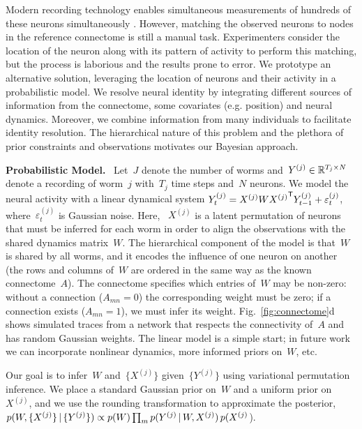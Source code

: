 \documentclass[twoside]{article}
\DeclareRobustCommand{\parhead}[1]{\textbf{#1}~}
\begin{document}
Modern recording technology enables simultaneous measurements of
hundreds of these neurons simultaneously \citep{Kato2015,
  nguyen2016whole}.  However, matching the observed neurons to nodes
in the reference connectome is still a manual task.  Experimenters
consider the location of the neuron along with its pattern of activity
to perform this matching, but the process is laborious and the results
prone to error. We prototype an alternative solution, leveraging the
location of neurons and their activity in a probabilistic model. We
resolve neural identity by integrating different sources of
information from the connectome, some covariates (e.g. position) and
neural dynamics. Moreover, we combine information from many
individuals to facilitate identity resolution.  The hierarchical
nature of this problem and the plethora of prior constraints and
observations motivates our Bayesian approach.

\parhead{Probabilistic Model.}  Let~$J$ denote the number of worms
and~${Y^{(j)} \in \mathbb{R}^{T_j \times N}}$ denote a recording of
worm~$j$ with~$T_j$ time steps and~$N$ neurons.  We model the neural
activity with a linear dynamical system
${Y^{(j)}_t = {X^{(j)}} W {X^{(j)}}^{\mathsf{T}}
  Y^{(j)}_{t-1}+\varepsilon^{(j)}_t}$, where~$\varepsilon_t^{(j)}$ is Gaussian noise.
Here, ~$X^{(j)}$ is a latent permutation of neurons that must be
inferred for each worm in order to align the observations with the
shared dynamics matrix~$W$.  The hierarchical component of the model
is that~$W$ is shared by all worms, and it encodes the influence of
one neuron on another (the rows and columns of~$W$ are ordered in the
same way as the known connectome~$A$). The connectome specifies which
entries of~$W$ may be non-zero: without a connection (${A_{mn}=0}$)
the corresponding weight must be zero; if a connection exists (${A_{mn}=1}$),
we must infer its weight.  Fig.~\ref{fig:connectome}d shows
simulated traces from a network that respects the connectivity of~$A$
and has random Gaussian weights.  The linear model is a simple start;
in future work we can incorporate nonlinear dynamics, more informed
priors on~$W$, etc.

Our goal is to infer~$W$ and~$\{X^{(j)}\}$ given~$\{Y^{(j)}\}$ using
variational permutation inference.  We place a standard Gaussian prior
on~$W$ and a uniform prior on~$X^{(j)}$, and we use the rounding
transformation to approximate the posterior,
$p(W,\{X^{(j)}\} \, | \, \{Y^{(j)}\})\propto p(W) \prod_m p(Y^{(j)} \, | \, W, {X^{(j)}}) \,  p({X^{(j)}}$).
\end{document}

